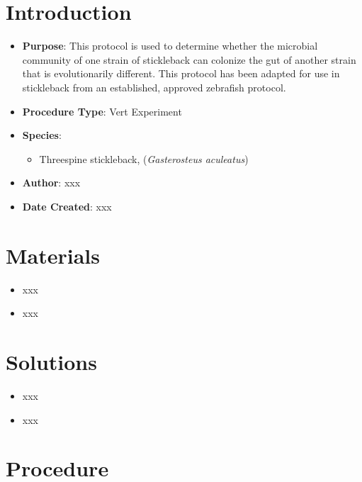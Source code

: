 \documentclass[
  letterpaper,
  DIV=11,
  numbers=noendperiod]{scrreprt}
\providecommand{\tightlist}{%
  \setlength{\itemsep}{0pt}\setlength{\parskip}{0pt}}\usepackage{longtable,booktabs,array}
\begin{document}
\hypertarget{introduction-81}{%
\section{Introduction}\label{introduction-81}}

\begin{itemize}
\tightlist
\item
  \textbf{Purpose}: This protocol is used to determine whether the
  microbial community of one strain of stickleback can colonize the gut
  of another strain that is evolutionarily different. This protocol has
  been adapted for use in stickleback from an established, approved
  zebrafish protocol.
\item
  \textbf{Procedure Type}: Vert Experiment
\item
  \textbf{Species}:

  \begin{itemize}
  \tightlist
  \item
    Threespine stickleback, (\emph{Gasterosteus aculeatus})
  \end{itemize}
\item
  \textbf{Author}: xxx
\item
  \textbf{Date Created}: xxx
\end{itemize}

\hypertarget{materials-77}{%
\section{Materials}\label{materials-77}}

\begin{itemize}
\tightlist
\item
  xxx
\item
  xxx
\end{itemize}

\hypertarget{solutions-69}{%
\section{Solutions}\label{solutions-69}}

\begin{itemize}
\tightlist
\item
  xxx
\item
  xxx
\end{itemize}

\hypertarget{procedure-76}{%
\section{Procedure}\label{procedure-76}}
\end{document}
